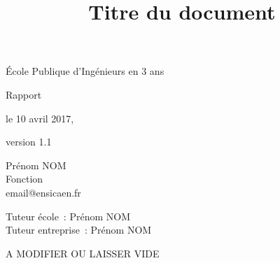 \documentclass[a4paper]{book}
\title{Titre du document}
\begin{document}
\makeatletter
{}
\begin{titlepage}
  \begin{center}
    \huge\color{ensigray}École Publique d'Ingénieurs en 3 ans
  \end{center}
  \vspace{1.5in}
  \begin{center}
    \LARGE Rapport
  \end{center}
  \vspace{0.5cm}
  \begin{minipage}{1\linewidth}
    \centering
    {\Huge  \MakeUppercase{\@title}}
  \end{minipage}
  \vspace{4em}
  \begin{center}\large
    le 10 avril 2017,

    version 1.1
  \end{center}
  \vspace{4em}

  \noindent\begin{minipage}[t]{0.47\linewidth}
    \begin{flushright}
      \large
      Prénom NOM\\
      Fonction\\
      {\color{ensiblue}email@ensicaen.fr}
    \end{flushright}
  \end{minipage}\hfill\vrule\hfill
  \begin{minipage}[t]{0.47\linewidth}
    \large
    Tuteur école~: Prénom NOM\\
    Tuteur entreprise~: Prénom NOM\\
  \end{minipage}
  \vfill


  \noindent\begin{minipage}[c]{0.33\linewidth}
    \center
    {\color{red} A MODIFIER OU LAISSER VIDE}


\end{minipage}
\end{titlepage}
\end{document}
